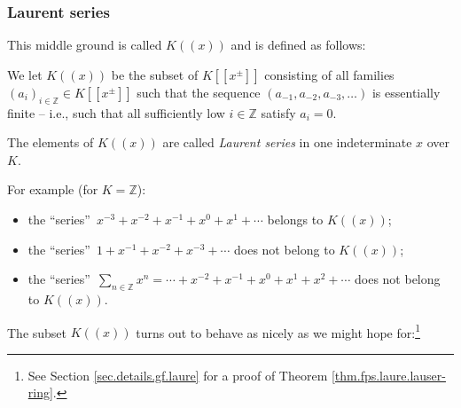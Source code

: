\subsubsection{Laurent series}

This middle ground is called $K\left(  \left(  x\right)  \right)  $ and is
defined as follows:

\begin{definition}
\label{def.fps.laure.lauser}We let $K\left(  \left(  x\right)  \right)  $ be
the subset of $K\left[  \left[  x^{\pm}\right]  \right]  $ consisting of all
families $\left(  a_{i}\right)  _{i\in\mathbb{Z}}\in K\left[  \left[  x^{\pm
}\right]  \right]  $ such that the sequence $\left(  a_{-1},a_{-2}%
,a_{-3},\ldots\right)  $ is essentially finite -- i.e., such that all
sufficiently low $i\in\mathbb{Z}$ satisfy $a_{i}=0$.

The elements of $K\left(  \left(  x\right)  \right)  $ are called
\emph{Laurent series} in one indeterminate $x$ over $K$.
\end{definition}

For example (for $K=\mathbb{Z}$):

\begin{itemize}
\item the \textquotedblleft series\textquotedblright\ $x^{-3}+x^{-2}%
+x^{-1}+x^{0}+x^{1}+\cdots$ belongs to $K\left(  \left(  x\right)  \right)  $;

\item the \textquotedblleft series\textquotedblright\ $1+x^{-1}+x^{-2}%
+x^{-3}+\cdots$ does not belong to $K\left(  \left(  x\right)  \right)  $;

\item the \textquotedblleft series\textquotedblright\ $\sum_{n\in\mathbb{Z}%
}x^{n}=\cdots+x^{-2}+x^{-1}+x^{0}+x^{1}+x^{2}+\cdots$ does not belong to
$K\left(  \left(  x\right)  \right)  $.
\end{itemize}

The subset $K\left(  \left(  x\right)  \right)  $ turns out to behave as
nicely as we might hope for:\footnote{See Section \ref{sec.details.gf.laure}
for a proof of Theorem \ref{thm.fps.laure.lauser-ring}.}

